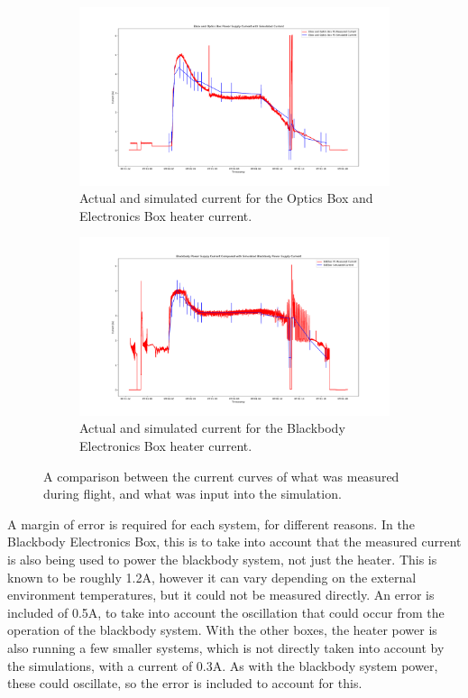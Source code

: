 \begin{figure}
    \centering
    \begin{subfigure}[h]{0.8\textwidth}
        \centering
        \includegraphics[width=\textwidth]{chap4_images/Ebox_OBox_I_sim_and_actual.png}
        \caption{Actual and simulated current for the Optics Box and Electronics Box heater current.}
        \label{fig:actual_sim_current_obox_ebox}
    \end{subfigure}
    \begin{subfigure}[h]{0.9\textwidth}
        \centering
        \includegraphics[width=\textwidth]{chap4_images/BBEbox_I_sim_and_actual.png}
        \caption{Actual and simulated current for the Blackbody Electronics Box heater current.}
        \label{fig:actual_sim_current_bbebox}
    \end{subfigure}
    \caption{A comparison between the current curves of what was measured during flight, and what was input into the simulation.}
    \label{fig:actual_sim_current}
\end{figure}

A margin of error is required for each system, for different reasons. In the Blackbody Electronics Box, this is to take into account that the measured current is also being used to power the blackbody system, not just the heater. This is known to be roughly 1.2A, however it can vary depending on the external environment temperatures, but it could not be measured directly. An error is included of 0.5A, to take into account the oscillation that could occur from the operation of the blackbody system. With the other boxes, the heater power is also running a few smaller systems, which is not directly taken into account by the simulations, with a current of 0.3A. As with the blackbody system power, these could oscillate, so the error is included to account for this.

